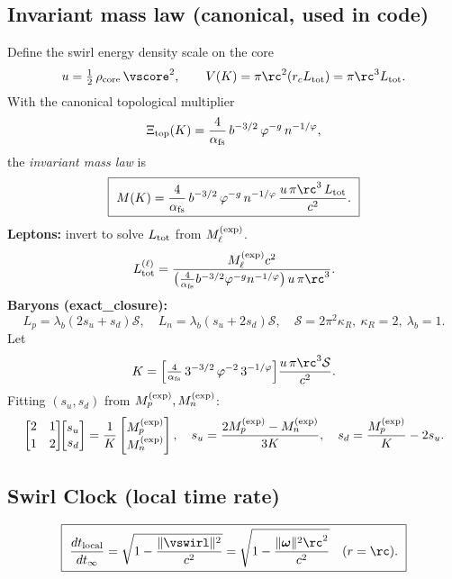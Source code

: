 \documentclass[11pt]{article}
\begin{document}
    \subsection*{Invariant mass law (canonical, used in code)}
        Define the swirl energy density scale on the core
        \[
            u=\tfrac12\,\rho_{\rm core}\,\vscore^2,
            \qquad
            V(K)=\pi \rc^2 (r_c L_{\rm tot})=\pi \rc^3 L_{\rm tot}.
        \]
        With the canonical topological multiplier
        \[
            \Xi_{\rm top}(K)=\frac{4}{\alpha_{\rm fs}}\,b^{-3/2}\,\varphi^{-g}\,n^{-1/\varphi},
        \]
        the \emph{invariant mass law} is
        \[
            \boxed{~
            M(K)=\frac{4}{\alpha_{\rm fs}}\,b^{-3/2}\,\varphi^{-g}\,n^{-1/\varphi}\,
            \frac{u\,\pi \rc^3\,L_{\rm tot}}{c^2}.
            ~}
        \]
        \textbf{Leptons:} invert to solve $L_{\rm tot}$ from $M_\ell^{\rm (exp)}$.
        \[
            L_{\rm tot}^{(\ell)}=
            \frac{M_\ell^{\rm (exp)} c^2}
            {\big(\tfrac{4}{\alpha_{\rm fs}}b^{-3/2}\varphi^{-g}n^{-1/\varphi}\big)\,u\,\pi \rc^3}.
        \]
        \textbf{Baryons (exact\_closure):}
        \[
            L_p=\lambda_b(2s_u+s_d)\mathcal S,\quad
            L_n=\lambda_b(s_u+2s_d)\mathcal S,\quad
            \mathcal S=2\pi^2\kappa_R,\ \kappa_R=2,\ \lambda_b=1.
        \]
        Let
        \[
            K=\Big[\tfrac{4}{\alpha_{\rm fs}}\,3^{-3/2}\,\varphi^{-2}\,3^{-1/\varphi}\Big]
            \frac{u\,\pi \rc^3\mathcal S}{c^2}.
        \]
        Fitting $(s_u,s_d)$ from $M_p^{\rm (exp)},M_n^{\rm (exp)}$:
        \[
            \begin{bmatrix}2&1\\[2pt]1&2\end{bmatrix}\!\!
            \begin{bmatrix}s_u\\ s_d\end{bmatrix}
            =\frac{1}{K}\begin{bmatrix}M_p^{\rm (exp)}\\ M_n^{\rm (exp)}\end{bmatrix},
            \quad
            s_u=\frac{2M_p^{\rm (exp)}-M_n^{\rm (exp)}}{3K},\quad
            s_d=\frac{M_p^{\rm (exp)}}{K}-2s_u.
        \]

    \subsection*{Swirl Clock (local time rate)}
        \[
            \boxed{~
            \frac{dt_{\rm local}}{dt_\infty}=\sqrt{1-\frac{\|\vswirl\|^{2}}{c^{2}}}
                =\sqrt{1-\frac{\|\boldsymbol\omega\|^{2}\rc^{2}}{c^{2}}}\quad(r=\rc).
                ~}
        \]
\end{document}
